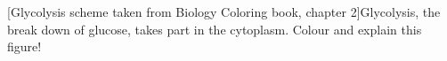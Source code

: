 {\begin{minipage}[htbp]{0.9\columnwidth}
	\vspace{2pt}
	\end{minipage}
	      }{   
			\vspace{4pt}
	\begin{minipage}[htbp]{0.9\columnwidth}
	   [Glycolysis scheme taken from Biology Coloring book, chapter 2]{Glycolysis, the break down of glucose, takes part in the cytoplasm. Colour and explain this figure!}   \label{fig:GlykolyseMarkl}
	\vspace{2pt}
	\end{minipage}
	      }	      
	      

